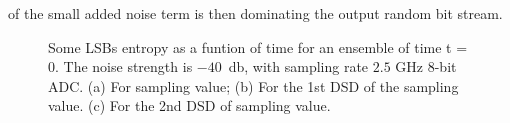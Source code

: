 of the small added noise term is then dominating the output random bit
stream.
%
\begin{figure}
  \centering
  \caption{Some LSBs entropy as a funtion of time for an ensemble of
    time t = 0. The noise strength is $-40$~db, with sampling rate
    $2.5$ GHz $8$-bit ADC. (a) For sampling value; (b) For the 1st DSD
    of the sampling value. (c) For the 2nd DSD of sampling value.}
  \label{entropy_signal_lsbmsb}
\end{figure}
%

